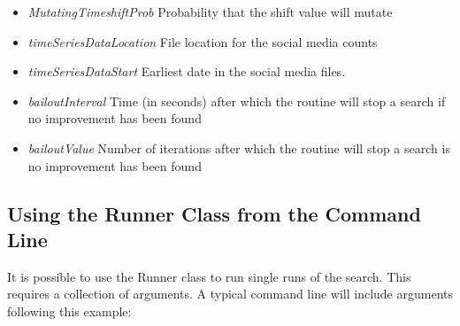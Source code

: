 \begin{itemize}
\item \textit{MutatingTimeshiftProb} Probability that the shift value will mutate
\item \textit{timeSeriesDataLocation} File location for the social media counts
\item \textit{timeSeriesDataStart} Earliest date in the social media files.
\item \textit{bailoutInterval} Time (in seconds) after which the routine will stop a search if no improvement has been found
\item \textit{bailoutValue} Number of iterations after which the routine will stop a search is no improvement has been found
\end{itemize}

\subsection{Using the Runner Class from the Command Line}

It is possible to use the Runner class to run single runs of the search. This requires a collection of arguments. A typical command line will include arguments following this example:

